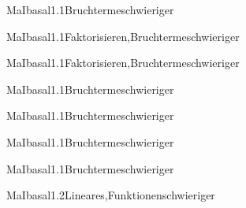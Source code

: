 \documentclass[12pt]{article}
\begin{document}
\begin{Add}{MaI}{basal1.1}{Bruchterme}{schwieriger}
\end{Add}

\begin{Add}{MaI}{basal1.1}{Faktorisieren,Bruchterme}{schwieriger}
\end{Add}

\begin{Add}{MaI}{basal1.1}{Faktorisieren,Bruchterme}{schwieriger}
\end{Add}

\begin{Add}{MaI}{basal1.1}{Bruchterme}{schwieriger}
\end{Add}

\begin{Add}{MaI}{basal1.1}{Bruchterme}{schwieriger}
\end{Add}

\begin{Add}{MaI}{basal1.1}{Bruchterme}{schwieriger}
\end{Add}

\begin{Add}{MaI}{basal1.1}{Bruchterme}{schwieriger}
\end{Add}

\begin{Add}{MaI}{basal1.2}{Lineares,Funktionen}{schwieriger}
\end{Add}
\end{document}
